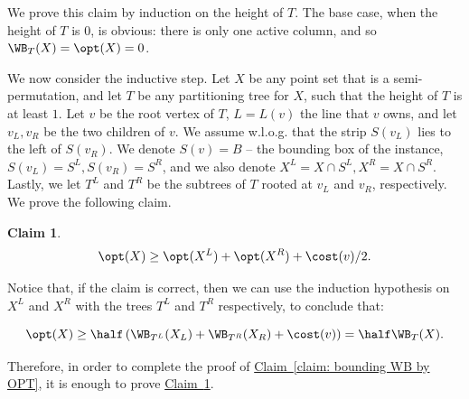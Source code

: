 \documentclass[11pt]{article}
\numberwithin{equation}{section}
\newtheorem{claim}[theorem]{Claim}
\theoremstyle{definition}
\theoremstyle{plain}
\newcommand{\expref}[2]{\hyperref[#2]{#1~\ref{#2}}}
\begin{document}
We prove this claim by induction on the height of $T$. 
The base case, when the height of $T$ is $0$, is obvious: there is only one active column, and so $\WB_T(X) = \opt(X) = 0$. 



We now consider the inductive step.
Let $X$ be any point set that is a semi-permutation, and let $T$ be any partitioning tree for $X$, such that the height of $T$ is at least $1$. Let $v$ be the root vertex of $T$, $L=L(v)$ the line that $v$ owns, and let $v_L,v_R$ be the two children of $v$. We assume w.l.o.g. that 
the strip $S(v_L)$ lies to the left of $S(v_R)$. We denote $S(v)=B$ -- the bounding box of the instance, $S(v_L)=S^L,S(v_R)=S^R$, and we also denote $X^L=X\cap S^L,X^R=X\cap S^R$. Lastly, we let $T^L$ and $T^R$ be the subtrees of $T$ rooted at $v_L$ and $v_R$, respectively.
We prove the following claim.

\begin{claim}\label{claim: ind step}
	\[\opt(X)\geq \opt(X^L)+\opt(X^R)+\cost(v)/2.\]
	\end{claim}

Notice that, if the claim is correct, then we can use the induction hypothesis on $X^L$ and $X^R$ with the trees $T^L$ and $T^R$ respectively, to conclude that:

\[\opt(X)\geq \half \left(\WB_{T^L}(X_L)+\WB_{T^R}(X_R)+\cost(v)\right )=\half \WB_T(X).\]

Therefore, in order to complete the proof of \expref{Claim}{claim: bounding WB by OPT}, it is enough to prove \expref{Claim}{claim: ind step}.
\end{document}
